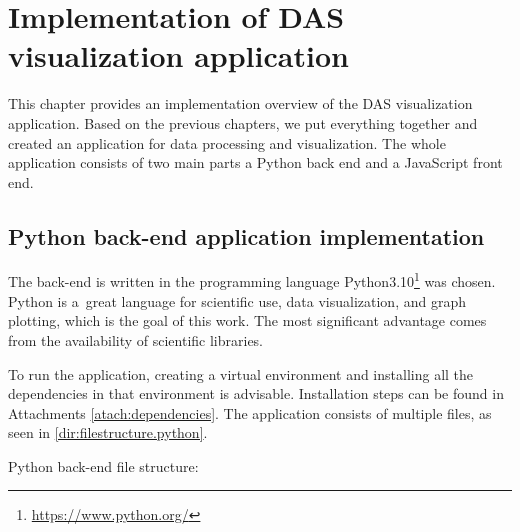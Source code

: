\chapter{Implementation of DAS visualization application}\label{txt.implementation}

This chapter provides an implementation overview of the DAS visualization application. Based on the previous chapters, we put everything together and created an application for data processing and visualization. The whole application consists of two main parts a Python back end and a JavaScript front end. 

\section{Python back-end application implementation}\label{txt.implementation.python}

The back-end is written in the programming language Python3.10\footnote{\url{https://www.python.org/}} was chosen. Python is a~great language for scientific use, data visualization, and graph plotting, which is the goal of this work. The most significant advantage comes from the availability of scientific libraries. 

To run the application, creating a virtual environment and installing all the dependencies in that environment is advisable. Installation steps can be found in Attachments \ref{atach:dependencies}. The application consists of multiple files, as seen in \ref{dir:filestructure.python}. 

\bigskip
Python back-end file structure:

{\small
%
\label{dir:filestructure.python}
}
\bigskip


